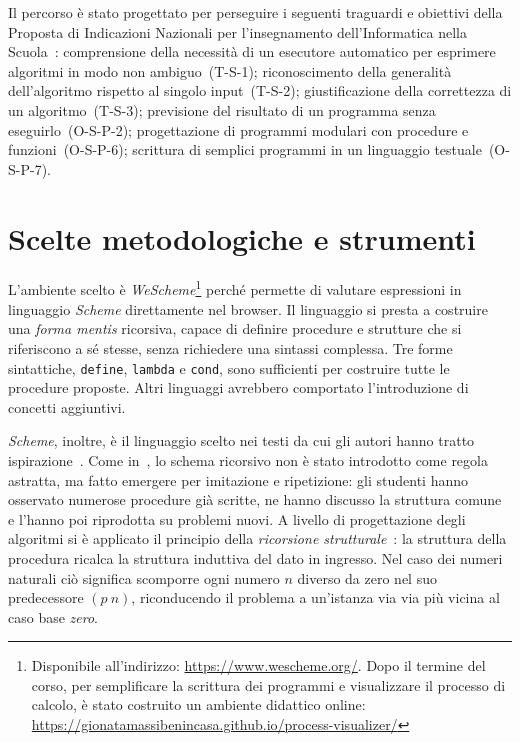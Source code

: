 \documentclass[withtimes]{easychair}
\begin{document}
Il percorso è stato progettato per perseguire i seguenti traguardi e obiettivi della Proposta di Indicazioni Nazionali per l'insegnamento dell'Informatica nella Scuola~\cite{cini2017indicazioni}: comprensione della necessità di un esecutore automatico per esprimere algoritmi in modo non ambiguo~(T-S-1); riconoscimento della generalità dell'algoritmo rispetto al singolo input~(T-S-2); giustificazione della correttezza di un algoritmo~(T-S-3); previsione del risultato di un programma senza eseguirlo~(O-S-P-2); progettazione di programmi modulari con procedure e funzioni~(O-S-P-6); scrittura di semplici programmi in un linguaggio testuale~(O-S-P-7).

\section{Scelte metodologiche e strumenti}\label{metodologia-e-strumenti}

L'ambiente scelto è \emph{WeScheme}\footnote{Disponibile all'indirizzo: \url{https://www.wescheme.org/}. Dopo il termine del corso, per semplificare la scrittura dei programmi e visualizzare il processo di calcolo, è stato costruito un ambiente didattico online: \mbox{\url{https://gionatamassibenincasa.github.io/process-visualizer/}}} perché permette di valutare espressioni in linguaggio \emph{Scheme} direttamente nel browser. Il linguaggio si presta a costruire una \emph{forma mentis} ricorsiva, capace di definire procedure e strutture che si riferiscono a sé stesse, senza richiedere una sintassi complessa. Tre forme sintattiche, \texttt{define}, \texttt{lambda} e \texttt{cond}, sono sufficienti per costruire tutte le procedure proposte. Altri linguaggi avrebbero comportato l'introduzione di concetti aggiuntivi.

\emph{Scheme}, inoltre, è il linguaggio scelto nei testi da cui gli autori hanno tratto ispirazione~\cite{Abelson1996,Felleisen2018,Friedman1995}. Come in~\cite{Friedman1995}, lo schema ricorsivo non è stato introdotto come regola astratta, ma fatto emergere per imitazione e ripetizione: gli studenti hanno osservato numerose procedure già scritte, ne hanno discusso la struttura comune e l'hanno poi riprodotta su problemi nuovi. A livello di progettazione degli algoritmi si è applicato il principio della \emph{ricorsione strutturale}~\cite{Felleisen2018}: la struttura della procedura ricalca la struttura induttiva del dato in ingresso. Nel caso dei numeri naturali ciò significa scomporre ogni numero $n$ diverso da zero nel suo predecessore $(p\ n)$, riconducendo il problema a un'istanza via via più vicina al caso base \emph{zero}.
\end{document}
